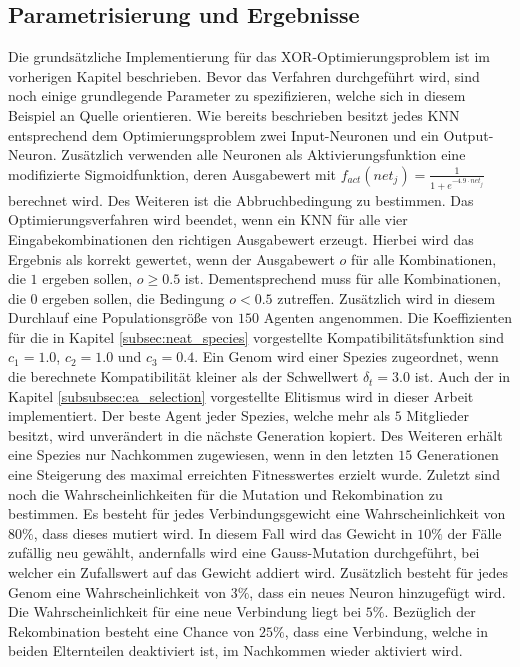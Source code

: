 \subsection{Parametrisierung und Ergebnisse}
Die grundsätzliche Implementierung für das XOR-Optimierungsproblem ist im vorherigen Kapitel beschrieben. Bevor das Verfahren durchgeführt wird, sind noch einige grundlegende Parameter zu spezifizieren, welche sich in diesem Beispiel an Quelle \cite{stanley2002evolving} orientieren. Wie bereits beschrieben besitzt jedes \ac{KNN} entsprechend dem Optimierungsproblem zwei Input-Neuronen und ein Output-Neuron. Zusätzlich verwenden alle Neuronen als Aktivierungsfunktion eine modifizierte Sigmoidfunktion, deren Ausgabewert mit $f_{act}(net_j)=\frac{1}{1+e^{-4.9\cdot net_j}}$ berechnet wird. Des Weiteren ist die Abbruchbedingung zu bestimmen. Das Optimierungsverfahren wird beendet, wenn ein \ac{KNN} für alle vier Eingabekombinationen den richtigen Ausgabewert erzeugt. Hierbei wird das Ergebnis als korrekt gewertet, wenn der Ausgabewert $o$ für alle Kombinationen, die $1$ ergeben sollen, $o \geq 0.5$ ist. Dementsprechend muss für alle Kombinationen, die $0$ ergeben sollen, die Bedingung $o < 0.5$ zutreffen. Zusätzlich wird in diesem Durchlauf eine Populationsgröße von $150$ Agenten angenommen. Die Koeffizienten für die in Kapitel \ref{subsec:neat_species} vorgestellte Kompatibilitätsfunktion sind $c_1=1.0$, $c_2=1.0$ und $c_3=0.4$. Ein Genom wird einer Spezies zugeordnet, wenn die berechnete Kompatibilität kleiner als der Schwellwert $\delta_t=3.0$ ist. Auch der in Kapitel \ref{subsubsec:ea_selection} vorgestellte Elitismus wird in dieser Arbeit implementiert. Der beste Agent jeder Spezies, welche mehr als $5$ Mitglieder besitzt, wird unverändert in die nächste Generation kopiert. Des Weiteren erhält eine Spezies nur Nachkommen zugewiesen, wenn in den letzten $15$ Generationen eine Steigerung des maximal erreichten Fitnesswertes erzielt wurde. Zuletzt sind noch die Wahrscheinlichkeiten für die Mutation und Rekombination zu bestimmen. Es besteht für jedes Verbindungsgewicht eine Wahrscheinlichkeit von $80\%$, dass dieses mutiert wird. In diesem Fall wird das Gewicht in $10\%$ der Fälle zufällig neu gewählt, andernfalls wird eine Gauss-Mutation durchgeführt, bei welcher ein Zufallswert auf das Gewicht addiert wird. Zusätzlich besteht für jedes Genom eine Wahrscheinlichkeit von $3\%$, dass ein neues Neuron hinzugefügt wird. Die Wahrscheinlichkeit für eine neue Verbindung liegt bei $5\%$. Bezüglich der Rekombination besteht eine Chance von $25\%$, dass eine Verbindung, welche in beiden Elternteilen deaktiviert ist, im Nachkommen wieder aktiviert wird. 
